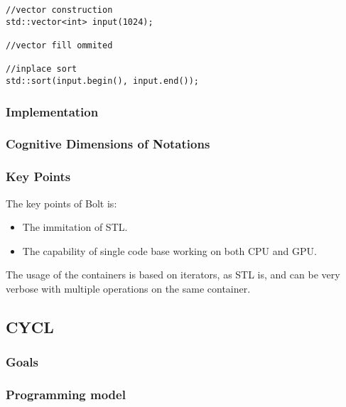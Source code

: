 \begin{lstlisting}[caption={STL sort example}, label={code:boltExample2}]
//vector construction
std::vector<int> input(1024);

//vector fill ommited

//inplace sort
std::sort(input.begin(), input.end());
\end{lstlisting}

\subsubsection{Implementation}

\subsubsection{Cognitive Dimensions of Notations}

\subsubsection{Key Points}
The key points of Bolt is:

\begin{itemize}
\item The immitation of STL.
\item The capability of single code base working on both CPU and GPU.
\end{itemize}

The usage of the containers is based on iterators, as STL is, and can be very verbose with multiple operations on the same container.


\subsection{CYCL}

\subsubsection{Goals}

\subsubsection{Programming model}

